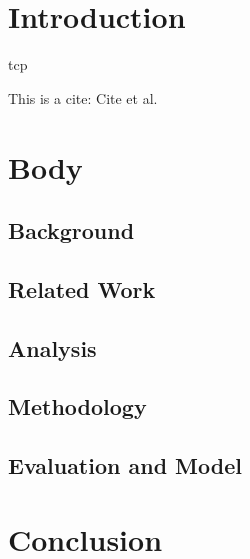 \chapter{Introduction}

\Ac{tcp}

This is a cite: Cite et al.~\cite{KaRaHuKa2008} 

\Blindtext

\chapter{Body}

\Blindtext

\section{Background}

\section{Related Work}

\section{Analysis}

\section{Methodology}

\section{Evaluation and Model}

\chapter{Conclusion}

\Blindtext